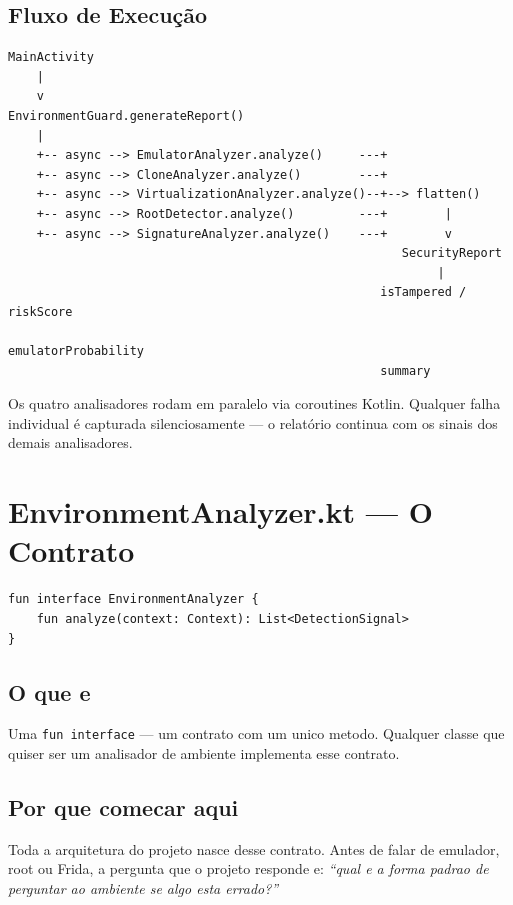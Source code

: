 \documentclass[12pt,a4paper]{article}
\begin{document}
\subsection{Fluxo de Execução}

\begin{lstlisting}
MainActivity
    |
    v
EnvironmentGuard.generateReport()
    |
    +-- async --> EmulatorAnalyzer.analyze()     ---+
    +-- async --> CloneAnalyzer.analyze()        ---+
    +-- async --> VirtualizationAnalyzer.analyze()--+--> flatten()
    +-- async --> RootDetector.analyze()         ---+        |
    +-- async --> SignatureAnalyzer.analyze()    ---+        v
                                                       SecurityReport
                                                            |
                                                    isTampered / riskScore
                                                    emulatorProbability
                                                    summary
\end{lstlisting}

Os quatro analisadores rodam em paralelo via coroutines Kotlin.
Qualquer falha individual é capturada silenciosamente --- o relatório
continua com os sinais dos demais analisadores.

\newpage

\section{EnvironmentAnalyzer.kt --- O Contrato}

\begin{lstlisting}
fun interface EnvironmentAnalyzer {
    fun analyze(context: Context): List<DetectionSignal>
}
\end{lstlisting}

\subsection{O que e}

Uma \texttt{fun interface} --- um contrato com um unico metodo.
Qualquer classe que quiser ser um analisador de ambiente implementa esse contrato.

\subsection{Por que comecar aqui}

Toda a arquitetura do projeto nasce desse contrato.
Antes de falar de emulador, root ou Frida, a pergunta que o projeto responde e:
\textit{``qual e a forma padrao de perguntar ao ambiente se algo esta errado?''}
\end{document}
